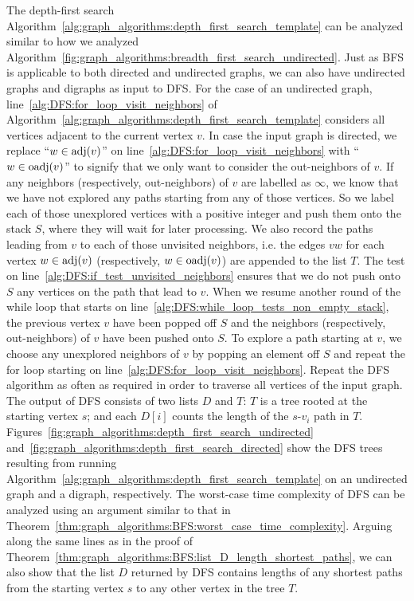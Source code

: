 The depth-first search
Algorithm~\ref{alg:graph_algorithms:depth_first_search_template} can
be analyzed similar to how we analyzed
Algorithm~\ref{fig:graph_algorithms:breadth_first_search_undirected}. Just
as BFS is applicable to both directed and undirected
graphs, we can also have undirected graphs and digraphs as input to
DFS. For the case of an undirected graph,
line~\ref{alg:DFS:for_loop_visit_neighbors} of
Algorithm~\ref{alg:graph_algorithms:depth_first_search_template}
considers all vertices adjacent to the current vertex $v$. In case the
input graph is directed, we replace ``$w \in \operatorname*{adj}(v)$'' on
line~\ref{alg:DFS:for_loop_visit_neighbors} with ``$w \in \operatorname*{oadj}(v)$''
to signify that we only want to consider the
out-neighbors of $v$. If any neighbors
(respectively, out-neighbors) of $v$ are labelled
as $\infty$, we know that we have not explored any paths starting from
any of those vertices. So we label each of those unexplored vertices
with a positive integer and push them onto the stack $S$,
where they will wait for later processing. We also record the paths
leading from $v$ to each of those unvisited neighbors, i.e. the edges
$vw$ for each vertex $w \in \operatorname*{adj}(v)$ (respectively, $w \in \operatorname*{oadj}(v)$)
are appended to the list $T$. The test on
line~\ref{alg:DFS:if_test_unvisited_neighbors} ensures that we do not
push onto $S$ any vertices on the path that lead to $v$. When we
resume another round of the while loop that starts on
line~\ref{alg:DFS:while_loop_tests_non_empty_stack}, the previous
vertex $v$ have been popped off $S$ and the neighbors
(respectively, out-neighbors) of $v$ have been
pushed onto $S$. To explore a path starting at $v$,
we choose any unexplored neighbors of $v$ by popping an element off
$S$ and repeat the for loop starting on
line~\ref{alg:DFS:for_loop_visit_neighbors}. Repeat the DFS
algorithm as often as required in order to traverse all vertices of
the input graph. The output of DFS consists of two lists
$D$ and $T$: $T$ is a tree rooted at the starting
vertex $s$; and each $D[i]$ counts the length of the $s$-$v_i$ path in
$T$. Figures~\ref{fig:graph_algorithms:depth_first_search_undirected}
and~\ref{fig:graph_algorithms:depth_first_search_directed} show the
DFS trees resulting from
running Algorithm~\ref{alg:graph_algorithms:depth_first_search_template}
on an undirected graph and a digraph, respectively. The worst-case
time complexity of DFS can be analyzed using an argument
similar to that in
Theorem~\ref{thm:graph_algorithms:BFS:worst_case_time_complexity}.
Arguing along the same lines as in the proof of
Theorem~\ref{thm:graph_algorithms:BFS:list_D_length_shortest_paths},
we can also show that the list $D$ returned by DFS contains
lengths of any shortest paths from the starting vertex $s$ to any
other vertex in the tree $T$.

